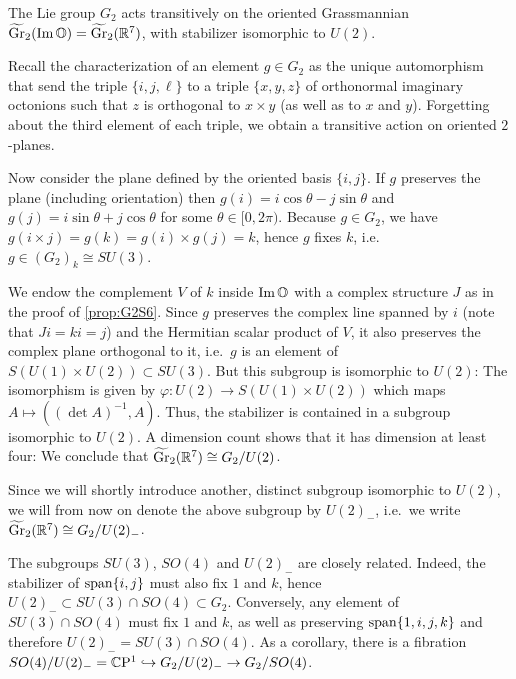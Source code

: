 \begin{prop}\label{prop:G2Planes}
	The Lie group $G_2$ acts transitively on the oriented Grassmannian $\widetilde{\operatorname{Gr}}_2(\operatorname{Im}\mathbb{O})=\widetilde {\operatorname{Gr}}_2(\mathbb{R}^7)$, with stabilizer isomorphic to $U(2)$.
\end{prop}
\begin{myproof}
	Recall the characterization of an element $g\in G_2$ as the unique automorphism that send the triple $\{i,j,\ell\}$ to a triple $\{x,y,z\}$ of orthonormal imaginary octonions such that $z$ is orthogonal to $x\times y$ (as well as to $x$ and $y$). Forgetting about the third element of each triple, we obtain a transitive action on oriented $2$-planes. 
	
	Now consider the plane defined by the oriented basis $\{i,j\}$. If $g$ preserves the plane (including orientation) then $g(i)=i\cos\theta-j\sin \theta$ and $g(j)=i\sin\theta+j\cos\theta$ for some $\theta\in[0,2\pi)$. Because $g\in G_2$, we have $g(i\times j)=g(k)=g(i)\times g(j)=k$, hence $g$ fixes $k$, i.e.~$g\in (G_2)_k\cong SU(3)$. 
	
	We endow the complement $V$ of $k$ inside $\operatorname{Im}\mathbb{O}$ with a complex structure $J$ as in the proof of \cref{prop:G2S6}. Since $g$ preserves the complex line spanned by $i$ (note that $Ji=ki=j$) and the Hermitian scalar product of $V$, it also preserves the complex plane orthogonal to it, i.e.~$g$ is an element of $S(U(1)\times U(2))\subset SU(3)$. But this subgroup is isomorphic to $U(2)$: The isomorphism is given by $\varphi:U(2)\to S(U(1)\times U(2))$ which maps $A\mapsto ((\det A)^{-1},A)$. Thus, the stabilizer is contained in a subgroup isomorphic to $U(2)$. A dimension count shows that it has dimension at least  four: We conclude that $\widetilde{\operatorname{Gr}}_2(\mathbb{R}^7)\cong G_2/U(2)$.
\end{myproof}

Since we will shortly introduce another, distinct subgroup isomorphic to $U(2)$, we will from now on denote the above subgroup by $U(2)_-$, i.e.~we write $\widetilde{\operatorname{Gr}}_2(\mathbb{R}^7)\cong G_2/U(2)_-$. 

\begin{rem}
	The subgroups $SU(3)$, $SO(4)$ and $U(2)_-$ are closely related. Indeed, the stabilizer of $\operatorname{span}\{i,j\}$ must also fix $1$ and $k$, hence $U(2)_-\subset SU(3)\cap SO(4)\subset G_2$. Conversely, any element of $SU(3)\cap SO(4)$ must fix $1$ and $k$, as well as preserving $\operatorname{span}\{1,i,j,k\}$ and therefore $U(2)_-=SU(3)\cap SO(4)$. As a corollary, there is a fibration $SO(4)/U(2)_-=\mathbb{C}\mathrm{P}^1\hookrightarrow G_2/U(2)_-\to G_2/SO(4)$.
\end{rem}


